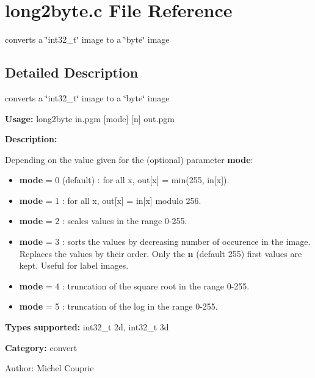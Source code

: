 \section{long2byte.c File Reference}
\label{long2byte_8c}
converts a \char`\"{}int32\_\-t\char`\"{} image to a \char`\"{}byte\char`\"{} image  




\label{_details}
\subsection{Detailed Description}
converts a \char`\"{}int32\_\-t\char`\"{} image to a \char`\"{}byte\char`\"{} image 

{\bf Usage:} long2byte in.pgm [mode] [n] out.pgm

{\bf Description:}

Depending on the value given for the (optional) parameter {\bf mode}: \begin{itemize}
\item {\bf mode} = 0 (default) : for all x, out[x] = min(255, in[x]). \item {\bf mode} = 1 : for all x, out[x] = in[x] modulo 256. \item {\bf mode} = 2 : scales values in the range 0-255. \item {\bf mode} = 3 : sorts the values by decreasing number of occurence in the image. Replaces the values by their order. Only the {\bf n} (default 255) first values are kept. Useful for label images. \item {\bf mode} = 4 : truncation of the square root in the range 0-255. \item {\bf mode} = 5 : truncation of the log in the range 0-255.\end{itemize}
{\bf Types supported:} int32\_\-t 2d, int32\_\-t 3d

{\bf Category:} convert

\begin{Desc}
\item[Author:]Michel Couprie \end{Desc}
